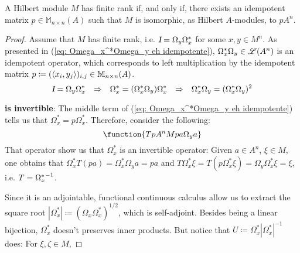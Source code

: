 \begin{teorema}\label{teo: M rank finito sse M = pA^n}
A Hilbert module $M$ has finite rank if, and only if, there exists an idempotent matrix $p\in \mathbb M_{n\times n}(A)$ such that $M$ is isomorphic, as Hilbert $A$-modules, to $p A^{n}$.
\begin{proof}
Assume that $M$ has finite rank, i.e. $\textsl{I} = \Omega_y\Omega_x^*$ for some $x,y \in M^n$. As presented in (\ref{eq: Omega_x^*Omega_y eh idempotente}), $\Omega_x^*\Omega_y \in \mathscr L(A^n)$ is an idempotent operator, which corresponds to left multiplication by the idempotent matrix $p\coloneqq (\langle {x_i},{y_j}\rangle)_{i,j} \in \mathbb M_{n\times n}(A)$.
\begin{equation}
\label{eq: Omega_x^*Omega_y eh idempotente}
    \textsl{I} = \Omega_y \Omega_x^* \hspace{0.25cm} \Rightarrow \hspace{0.25cm} \Omega_x^* = (\Omega_x^*\Omega_y) \Omega_x^* \hspace{0.25cm} \Rightarrow \hspace{0.25cm} \Omega_x^*\Omega_y = (\Omega_x^*\Omega_y)^2
\end{equation}
\begin{itroman}
    \item[]  \textbf{is invertible}: The middle term of (\ref{eq: Omega_x^*Omega_y eh idempotente}) tells us that $\Omega_x^*= p\Omega_x^* $. Therefore, consider the following:
\begin{equation*}
    \function{T{pA^n}{M}{pa}{\Omega_ya}}
\end{equation*}
That operator show us that $\Omega_x^*$ is an invertible operator: Given $a\in A^n$, $\xi \in M$,  one obtains that $\Omega_x^* T(pa) = \Omega_x^*\Omega_ya = pa$ and $T\Omega_x^* \xi = T(p\Omega_x^*\xi) = \Omega_y\Omega_x^*\xi = \xi$, i.e. $T = {\Omega_x^*}^{-1}$.
\end{itroman}
Since it is an adjointable, functional continuous calculus allow us to extract the square root $|\Omega_x^*| \coloneqq (\Omega_x\Omega_x^*)^{1/2}$, which is self-adjoint. Besides being a linear bijection, $\Omega_x^*$ doesn't preserves inner products. But notice that $U \coloneqq \Omega_x^*|\Omega_x^*|^{-1}$ does: For $\xi,\zeta \in M$,

\end{proof}
\end{teorema}
